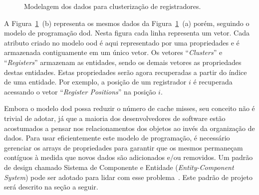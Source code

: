 \begin{figure}[ht]
    \centering
    \caption{Modelagem dos dados para clusterização de registradores.}
    \label{fig:modelo_register_clustering}
\end{figure}


A Figura~\ref{fig:modelo_register_clustering}~(b) representa os mesmos dados da Figura~\ref{fig:modelo_register_clustering}~(a) porém, seguindo o modelo de programação \ac{dod}.
Nesta figura cada linha representa um vetor.
Cada atributo criado no modelo \ac{ood} é aqui representado por uma propriedades e é armazenada contiguamente em um único vetor.
Os vetores ``\textit{Clusters}'' e ``\textit{Registers}'' armazenam as entidades, sendo os demais vetores as propriedades destas entidades.
Estas propriedades serão agora recuperadas a partir do índice de uma entidade.
Por exemplo, a posição de um registrador $i$ é recuperada acessando o vetor ``\textit{Register Positions}'' na posição $i$.

Embora o modelo \ac{dod} possa reduzir o número de cache misses, seu conceito não é trivial de adotar, já que a maioria dos desenvolvedores de software estão acostumados a pensar nos relacionamentos dos objetos ao invés da organização de dados. Para usar eficientemente este modelo de programação, é necessário gerenciar os arrays de propriedades para garantir que os mesmos permaneçam contíguos à medida que novos dados são adicionados e/ou removidos. Um padrão de design chamado Sistema de Componente e Entidade (\textit{Entity-Component System}) pode ser adotado para lidar com esse problema~\cite{nystrom2014game}. Este padrão de projeto será descrito na seção a seguir.

